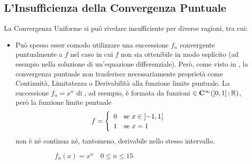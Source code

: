 \subsection{L'Insufficienza della Convergenza Puntuale}
\setcounter{theorem}{0} %
La Convergenza Uniforme si può rivelare insufficiente per diverse ragioni, tra cui:
\begin{itemize}
	\item
		Può spesso esser comodo utilizzare una successione $f_n$ convergente puntualmente a $f$ nel caso in cui $f$ non sia ottenibile in modo esplicito (ad esempio nella soluzione di un'equazione differenziale). Però, come visto in , la convergenza puntuale non trasferisce necessariamente proprietà come Continuità, Limitatezza o Derivabilità alla funzione limite puntuale.
		La successione $f_n = x^n$ di , ad esempio, è formata da funzioni $\in \mathbf{C^{\infty}}(\left[0,1\right]; \mathbb{R})$, però la funzione limite puntuale
		\[
			f =
			\begin{cases}
				\begin{array}{ll}
					0 & \text{se } x \in \left]-1,1\right[\\
					1 & \text{se } x = 1
				\end{array}
			\end{cases}
		\]
		non è né continua né, tantomeno, derivabile nello stesso intervallo.
		\begin{figure}[H]
			\begin{subfigure}{.49\textwidth}
				\centering
				\caption{$f_n(x) = x^n \quad 0 \leq n \leq 15$}
			\end{subfigure}
			\begin{subfigure}{.49\textwidth}
				\centering
				\resizebox{\linewidth}{!}{
					\begin{tikzpicture}
						\begin{axis} [
							xlabel={$x$},ylabel={$f(x)$},
							axis lines=middle,
							axis equal,
							ymax = 1.1,
							legend pos = outer north east
						]

\end{axis}
\end{tikzpicture}}
\end{subfigure}
\end{figure}
\end{itemize}
